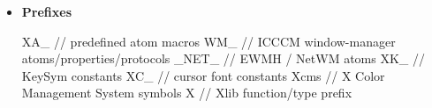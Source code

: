 \documentclass{report}
\begin{document}
\begin{itemize}
\begin{cppcode}
                "VISUALID"
                "WINDOW"
                "WM_COMMAND"
                "WM_HINTS"
                "WM_CLIENT_MACHINE"
                "WM_ICON_NAME"
                "WM_ICON_SIZE"
                "WM_NAME"
                "WM_NORMAL_HINTS"
            \end{cppcode}
            \bigbreak \noindent 
            \begin{cppcode}
                "WM_SIZE_HINTS"
                "WM_ZOOM_HINTS"
                "MIN_SPACE"
                "NORM_SPACE"
                "MAX_SPACE"
                "END_SPACE"
                "SUPERSCRIPT_X"
                "SUPERSCRIPT_Y"
                "SUBSCRIPT_X"
                "SUBSCRIPT_Y"
                "UNDERLINE_POSITION"
                "UNDERLINE_THICKNESS"
                "STRIKEOUT_ASCENT"
                "STRIKEOUT_DESCENT"
                "ITALIC_ANGLE"
            \end{cppcode}
            \bigbreak \noindent 
            \begin{cppcode}
                "X_HEIGHT"
                "QUAD_WIDTH"
                "WEIGHT"
                "POINT_SIZE"
                "RESOLUTION"
                "COPYRIGHT"
                "NOTICE"
                "FONT_NAME"
                "FAMILY_NAME"
                "FULL_NAME"
                "CAP_HEIGHT"
                "WM_CLASS"
                "WM_TRANSIENT_FOR"
            \end{cppcode}
        \item \textbf{Prefixes}
            \bigbreak \noindent 
            \begin{cppcode}
                XA_        // predefined atom macros
                WM_        // ICCCM window-manager atoms/properties/protocols
                _NET_      // EWMH / NetWM atoms
                XK_        // KeySym constants
                XC_        // cursor font constants
                Xcms       // X Color Management System symbols
                X          // Xlib function/type prefix
            \end{cppcode}
 


    \end{itemize}
\end{document}
